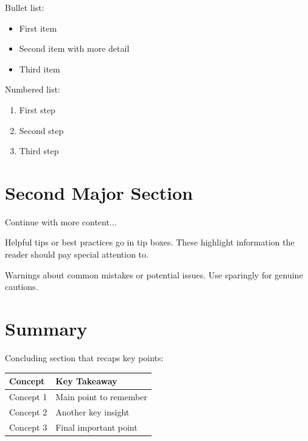 Bullet list:
\begin{itemize}
    \item First item
    \item Second item with more detail
    \item Third item
\end{itemize}

Numbered list:
\begin{enumerate}
    \item First step
    \item Second step
    \item Third step
\end{enumerate}

\section{Second Major Section}

Continue with more content...

\begin{tipbox}
Helpful tips or best practices go in tip boxes. These highlight
information the reader should pay special attention to.
\end{tipbox}

\begin{warningbox}
Warnings about common mistakes or potential issues. Use sparingly
for genuine cautions.
\end{warningbox}

\section{Summary}

Concluding section that recaps key points:

\begin{table}[htbp]
\centering
\begin{tabularx}{\textwidth}{lX}
\toprule
\textbf{Concept} & \textbf{Key Takeaway} \\
\midrule
Concept 1 & Main point to remember \\
Concept 2 & Another key insight \\
Concept 3 & Final important point \\
\bottomrule
\end{tabularx}
\end{table}

